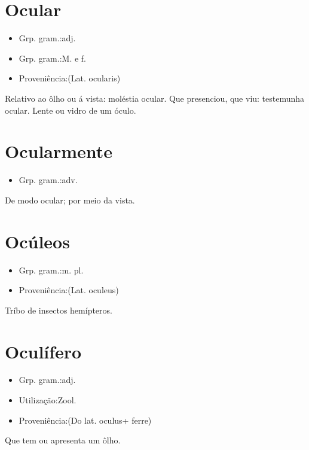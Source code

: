 \section{Ocular}
\begin{itemize}
\item {Grp. gram.:adj.}
\end{itemize}
\begin{itemize}
\item {Grp. gram.:M.  e  f.}
\end{itemize}
\begin{itemize}
\item {Proveniência:(Lat. \textunderscore ocularis\textunderscore )}
\end{itemize}
Relativo ao ôlho ou á vista: \textunderscore moléstia ocular\textunderscore .
Que presenciou, que viu: \textunderscore testemunha ocular\textunderscore .
Lente ou vidro de um óculo.
\section{Ocularmente}
\begin{itemize}
\item {Grp. gram.:adv.}
\end{itemize}
De modo ocular; por meio da vista.
\section{Ocúleos}
\begin{itemize}
\item {Grp. gram.:m. pl.}
\end{itemize}
\begin{itemize}
\item {Proveniência:(Lat. \textunderscore oculeus\textunderscore )}
\end{itemize}
Tríbo de insectos hemípteros.
\section{Oculífero}
\begin{itemize}
\item {Grp. gram.:adj.}
\end{itemize}
\begin{itemize}
\item {Utilização:Zool.}
\end{itemize}
\begin{itemize}
\item {Proveniência:(Do lat. \textunderscore oculus\textunderscore  + \textunderscore ferre\textunderscore )}
\end{itemize}
Que tem ou apresenta um ôlho.
